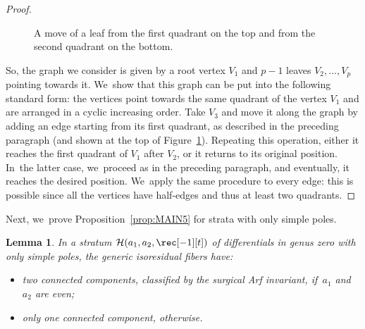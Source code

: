 \documentclass[JEP,XML,SOM,Unicode,NoFloatCountersInSection,published]{cedram}
\newtheorem{lem}[thm]{Lemma}
\theoremstyle{definition}
\begin{document}
\begin{proof}
\begin{figure}[ht]
\caption{A move of a leaf from the first quadrant on the top and from the second quadrant on the bottom.} \label{fig:operation2}
\end{figure}

So, the graph we consider is given by a root vertex $V_{1}$ and $p-1$ leaves $V_{2},\dots,V_{p}$ pointing towards it. We~show that this graph can be put into the following standard form: the vertices point towards the same quadrant of the vertex $V_{1}$ and are arranged in a cyclic increasing order. Take $V_{3}$ and move it along the graph by adding an edge starting from its first quadrant, as described in the preceding paragraph (and shown at the top of Figure~\ref{fig:operation2}). Repeating this operation, either it reaches the first quadrant of $V_{1}$ after $V_{2}$, or it returns to its original position. In~the latter case, we~proceed as in the preceding paragraph, and eventually, it reaches the desired position. We~apply the same procedure to every edge: this is possible since all the vertices have half-edges and thus at least two quadrants.
\end{proof}

Next, we~prove Proposition~\ref{prop:MAIN5} for strata with only simple poles.

\begin{lem}\label{lem:MAIN5Simple}
In a stratum $\mathcal{H}(a_{1},a_{2},\rec[-1][t])$ of differentials in genus zero with only simple poles, the generic isoresidual fibers have:
\begin{itemize}
\item two connected components, classified by the surgical Arf invariant, if~$a_{1}$ and $a_{2}$ are even;
\item only one connected component, otherwise.
\end{itemize}
\end{lem}
\end{document}
